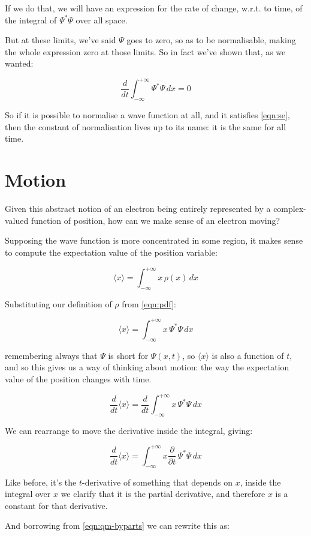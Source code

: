 If we do that, we will have an expression for the rate of change, w.r.t. to time, of the integral of $\Psi^*\Psi$ over all space.

But at these limits, we've said $\Psi$ goes to zero, so as to be normalisable, making the whole expression zero at those limits. So in fact we've shown that, as we wanted:

$$
\frac{d}{d t}
\int_{-\infty}^{+\infty}
\Psi^*\Psi
\,dx
= 0
$$

So if it is possible to normalise a wave function at all, and it satisfies \eqref{eqn:se}, then the constant of normalisation lives up to its name: it is the same for all time.

\section{Motion}

Given this abstract notion of an electron being entirely represented by a complex-valued function of position, how can we make sense of an electron moving?

Supposing the wave function is more concentrated in some region, it makes sense to compute the expectation value of the position variable:

$$
\langle x \rangle =
\int_{-\infty}^{+\infty}
x \, \rho(x)
\,dx
$$

Substituting our definition of $\rho$ from \eqref{eqn:pdf}:

$$
\langle x \rangle =
\int_{-\infty}^{+\infty}
x \, \Psi^*\Psi
\,dx
$$

remembering always that $\Psi$ is short for $\Psi(x, t)$, so $\langle x \rangle$ is also a function of $t$, and so this gives us a way of thinking about motion: the way the expectation value of the position changes with time.

$$
\frac{d}{dt} \langle x \rangle =
\frac{d}{dt}
\int_{-\infty}^{+\infty}
x \, \Psi^*\Psi
\,dx
$$

We can rearrange to move the derivative inside the integral, giving:

$$
\frac{d}{dt} \langle x \rangle =
\int_{-\infty}^{+\infty}
x \frac{\partial}{\partial t}
\, \Psi^*\Psi
\,dx
$$

Like before, it's the $t$-derivative of something that depends on $x$, inside the integral over $x$ we clarify that it is the partial derivative, and therefore $x$ is a constant for that derivative.

And borrowing from \eqref{eqn:qm-byparts} we can rewrite this as:

